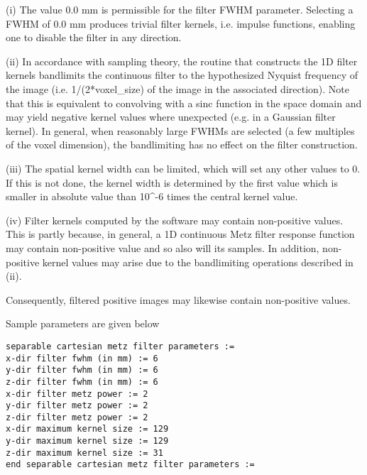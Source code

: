 \documentclass{article}
\begin{document}
(i) The value 0.0 mm is permissible for the filter FWHM parameter. 
Selecting a FWHM of 0.0 mm produces trivial filter kernels, i.e. 
impulse functions, enabling one to disable the filter in any 
direction. 



(ii) In accordance with sampling theory, the routine that constructs 
the 1D filter kernels bandlimits the continuous filter to the 
hypothesized Nyquist frequency of the image (i.e. 1/(2*voxel\_size) 
of the image in the associated direction). Note that this is 
equivalent to convolving with a sinc function in the space domain 
and may yield negative kernel values where unexpected (e.g. in 
a Gaussian filter kernel). In general, when reasonably large 
FWHMs are selected (a few multiples of the voxel dimension), 
the bandlimiting has no effect on the filter construction.



(iii) The spatial kernel width can be limited, which will set 
any other values to 0. If this is not done, the kernel width 
is determined by the first value which is smaller in absolute 
value than 10{\textasciicircum}-6 times the central kernel value.



(iv) Filter kernels computed by the software may contain non-positive 
values. This is partly because, in general, a 1D continuous Metz 
filter response function may contain non-positive value and so 
also will its samples. In addition, non-positive kernel values 
may arise due to the bandlimiting operations described in (ii). 



Consequently, filtered positive images may likewise contain non-positive 
values. 

{ 
}

Sample parameters are given below

\begin{verbatim}
separable cartesian metz filter parameters :=
x-dir filter fwhm (in mm) := 6
y-dir filter fwhm (in mm) := 6
z-dir filter fwhm (in mm) := 6
x-dir filter metz power := 2
y-dir filter metz power := 2
z-dir filter metz power := 2
x-dir maximum kernel size := 129
y-dir maximum kernel size := 129
z-dir maximum kernel size := 31
end separable cartesian metz filter parameters := 
\end{verbatim}
\end{document}
